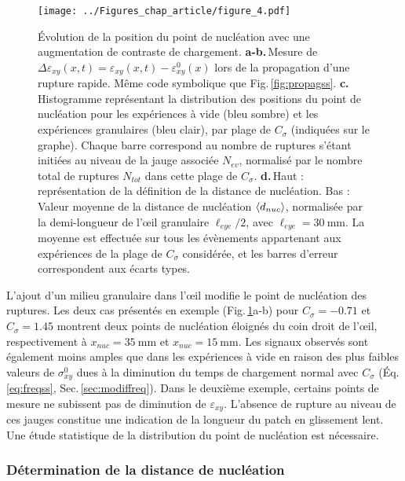 \begin{figure}[p]
\centering
\texttt{[image: ../Figures\_chap\_article/figure\_4.pdf]}
\caption[Nucléation et propagation -- œil granulaire]{Évolution de la position du point de nucléation avec une augmentation de contraste de chargement. \textbf{a-b.}\,Mesure de $\Delta\varepsilon_{xy}(x,t)=\varepsilon_{xy}(x,t)-\varepsilon_{xy}^0(x)$ lors de la propagation d'une rupture rapide. Même code symbolique que Fig.\,\ref{fig:propagss}. \textbf{c.}\,Histogramme représentant la distribution des positions du point de nucléation pour les expériences à vide (bleu sombre) et les expériences granulaires (bleu clair), par plage de $C_\sigma$ (indiquées sur le graphe). Chaque barre correspond au nombre de ruptures s'étant initiées au niveau de la jauge associée $N_{ev}$, normalisé par le nombre total de ruptures $N_{tot}$ dans cette plage de $C_\sigma$. \textbf{d.}\,Haut : représentation de la définition de la distance de nucléation. Bas : Valeur moyenne de la distance de nucléation $\left\langle {d_{nuc}} \right\rangle$, normalisée par la demi-longueur de l'œil granulaire $\ell_{eye}/2$, avec $\ell_{eye}=\SI{30}{\milli\meter}$. La moyenne est effectuée sur tous les évènements appartenant aux expériences de la plage de $C_\sigma$ considérée, et les barres d'erreur correspondent aux écarts types.}
\label{fig:papier4}
\end{figure}


L'ajout d'un milieu granulaire dans l'œil modifie le point de nucléation des ruptures. Les deux cas présentés en exemple (Fig.\,\ref{fig:papier4}a-b) pour $C_\sigma=-0.71$ et $C_\sigma=1.45$ montrent deux points de nucléation éloignés du coin droit de l'œil, respectivement à $x_{nuc}=\SI{35}{\milli\meter}$ et $x_{nuc}=\SI{15}{\milli\meter}$. Les signaux observés sont également moins amples que dans les expériences à vide en raison des plus faibles valeurs de $\sigma_{xy}^0$ dues à la diminution du temps de chargement normal avec $C_\sigma$ (Éq.\,\ref{eq:freqss}, Sec.\,\ref{sec:modiffreq}).
Dans le deuxième exemple, certains points de mesure ne subissent pas de diminution de $\varepsilon_{xy}$. L'absence de rupture au niveau de ces jauges constitue une indication de la longueur du patch en glissement lent. Une étude statistique de la distribution du point de nucléation est nécessaire.

\newpage


\subsubsection{Détermination de la distance de nucléation}


